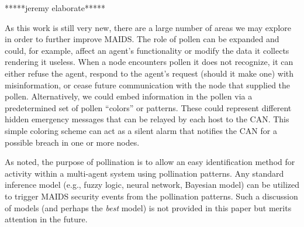 \documentclass{acm_proc_article-sp}
\begin{document}
*****jeremy elaborate*****

As this work is still very new, there are a large number of areas we may explore in order to further improve MAIDS.  The role of pollen can be expanded and could, for example, affect an agent's functionality or modify the data it collects rendering it useless.  When a node encounters pollen it does not recognize, it can either refuse the agent, respond to the agent's request (should it make one) with misinformation, or cease future communication with the node that supplied the pollen.  Alternatively, we could embed information in the pollen via a predetermined set of pollen ``colors'' or patterns.  These could represent different hidden emergency messages that can be relayed by each host to the CAN.  This simple coloring scheme can act as a silent alarm that notifies the CAN for a possible breach in one or more nodes.

As noted, the purpose of pollination is to allow an easy identification method for activity within a multi-agent system using pollination patterns.  Any standard inference model (e.g., fuzzy logic, neural network, Bayesian model) can be utilized to trigger MAIDS security events from the pollination patterns.  Such a discussion of models (and perhaps the {\it best} model) is not provided in this paper but merits attention in the future.

\nocite{*}


\balancecolumns
\end{document}
